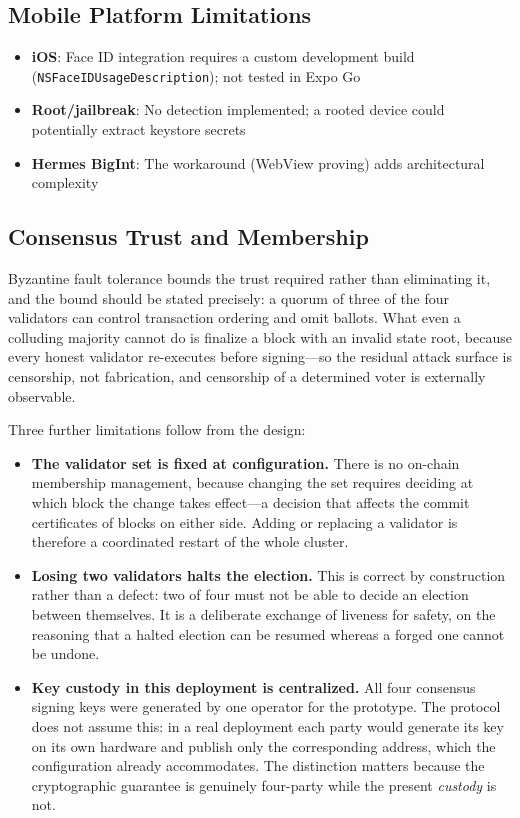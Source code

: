 \subsection{Mobile Platform Limitations}

\begin{itemize}
    \item \textbf{iOS}: Face ID integration requires a custom development build (\texttt{NSFaceIDUsageDescription}); not tested in Expo Go
    \item \textbf{Root/jailbreak}: No detection implemented; a rooted device could potentially extract keystore secrets
    \item \textbf{Hermes BigInt}: The workaround (WebView proving) adds architectural complexity
\end{itemize}

\subsection{Consensus Trust and Membership}

Byzantine fault tolerance bounds the trust required rather than eliminating it, and the bound should be stated precisely: a quorum of three of the four validators can control transaction ordering and omit ballots. What even a colluding majority cannot do is finalize a block with an invalid state root, because every honest validator re-executes before signing---so the residual attack surface is censorship, not fabrication, and censorship of a determined voter is externally observable.

Three further limitations follow from the design:

\begin{itemize}
    \item \textbf{The validator set is fixed at configuration.} There is no on-chain membership management, because changing the set requires deciding at which block the change takes effect---a decision that affects the commit certificates of blocks on either side. Adding or replacing a validator is therefore a coordinated restart of the whole cluster.
    \item \textbf{Losing two validators halts the election.} This is correct by construction rather than a defect: two of four must not be able to decide an election between themselves. It is a deliberate exchange of liveness for safety, on the reasoning that a halted election can be resumed whereas a forged one cannot be undone.
    \item \textbf{Key custody in this deployment is centralized.} All four consensus signing keys were generated by one operator for the prototype. The protocol does not assume this: in a real deployment each party would generate its key on its own hardware and publish only the corresponding address, which the configuration already accommodates. The distinction matters because the cryptographic guarantee is genuinely four-party while the present \emph{custody} is not.
\end{itemize}

